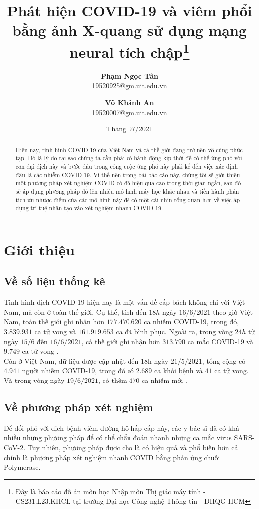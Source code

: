 \documentclass{article}
\title{\textbf{Phát hiện COVID-19 và viêm phổi \\ bằng ảnh X-quang sử dụng mạng neural tích chập\footnote[1]{Đây là báo cáo đồ án môn học Nhập môn Thị giác máy tính - CS231.L23.KHCL tại trường Đại học Công nghệ Thông tin - ĐHQG HCM}}}
\author{
  \textbf{Phạm Ngọc Tân}\\
  \small 19520925@gm.uit.edu.vn
  \and
  \textbf{Võ Khánh An}\\
  \small 19520007@gm.uit.edu.vn}
\date{Tháng 07/2021}
\begin{document}
\maketitle

\begin{abstract}
\justifying 
\noindent 
    Hiện nay, tình hình COVID-19 của Việt Nam và cả thế giới đang trở nên vô cùng phức tạp. Đó là lý do tại sao chúng ta cần phải có hành động kịp thời để có thể ứng phó với cơn đại dịch này và bước đầu trong công cuộc ứng phó này phải kể đến việc xác định đâu là các nhiễm COVID-19. Vì thế nên trong bài báo cáo này, chúng tôi sẽ giới thiệu một phương pháp xét nghiệm COVID có độ hiệu quả cao trong thời gian ngắn, sau đó sẽ áp dụng phương pháp đó lên nhiều mô hình máy học khác nhau và tiến hành phân tích ưu nhược điểm của các mô hình này để có một cái nhìn tổng quan hơn về việc áp dụng trí tuệ nhân tạo vào xét nghiệm nhanh COVID-19.
\end{abstract}

\section{Giới thiệu}
\subsection{Về số liệu thống kê}
Tình hình dịch COVID-19 hiện nay là một vấn đề cấp bách không chỉ với Việt Nam, mà còn ở toàn thế giới. Cụ thể, tính đến $18h$ ngày $16/6/2021$ theo giờ Việt Nam, toàn thế giới ghi nhận hơn $177.470.620$ ca nhiễm COVID-19, trong đó, $3.839.931$ ca tử vong và $161.919.653$ ca đã bình phục. Ngoài ra, trong vòng $24h$ từ ngày $15/6$ đến $16/6/2021$, cả thế giới ghi nhận hơn $313.790$ ca mắc COVID-19 và $9.749$ ca tử vong \cite{worldometers}.\\

Còn ở Việt Nam, dữ liệu được cập nhật đến $18$h ngày $21/5/2021$, tổng cộng có $4.941$ người nhiễm COVID-19, trong đó có $2.689$ ca khỏi bệnh và $41$ ca tử vong. Và trong vòng ngày $19/6/2021$, có thêm $470$ ca nhiễm mới \cite{ncov}.\\

\subsection{Về phương pháp xét nghiệm}
Để đối phó với dịch bệnh viêm đường hô hấp cấp này, các y bác sĩ đã có khá nhiều những phương pháp để có thể chẩn đoán nhanh những ca mắc virus SARS-CoV-2. Tuy nhiên, phương pháp được cho là có hiệu quả và phổ biến hơn cả chính là phương pháp xét nghiệm nhanh COVID bằng phản ứng chuỗi Polymerase.
\end{document}

